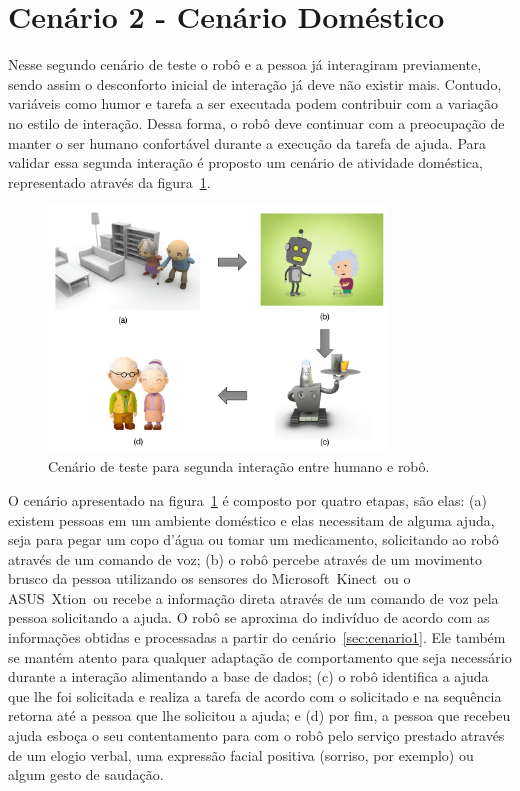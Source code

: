 \section{Cenário 2 - Cenário Doméstico}
\label{sec:cenario2}
Nesse segundo cenário de teste o robô e a pessoa já interagiram previamente, sendo assim o desconforto inicial de interação já deve não existir mais. Contudo, variáveis como humor e tarefa a ser executada podem contribuir com a variação no estilo de interação. Dessa forma, o robô deve continuar com a preocupação de manter o ser humano confortável durante a execução da tarefa de ajuda. Para validar essa segunda interação é proposto um cenário de atividade doméstica, representado através da figura~\ref{fig:cenario2}.

\begin{figure}[ht!]
	\centering
	\includegraphics[width=0.8\textwidth]{images/cenario02.png}
	\caption{Cenário de teste para segunda interação entre humano e robô.}
	\label{fig:cenario2}
\end{figure}

O cenário apresentado na figura~\ref{fig:cenario2} é composto por quatro etapas, são elas: (a) existem pessoas em um ambiente doméstico e elas necessitam de alguma ajuda, seja para pegar um copo d'água ou tomar um medicamento, solicitando ao robô através de um comando de voz; (b) o robô percebe através de um movimento brusco da pessoa utilizando os sensores do Microsoft\textregistered\ Kinect\textregistered\ ou o ASUS\textregistered\ Xtion\textregistered\ ou recebe a informação direta através de um comando de voz pela pessoa solicitando a ajuda. O robô se aproxima do indivíduo de acordo com as informações obtidas e processadas a partir do cenário~\ref{sec:cenario1}. Ele também se mantém atento para qualquer adaptação de comportamento que seja necessário durante a interação alimentando a base de dados; (c) o robô identifica a ajuda que lhe foi solicitada e realiza a tarefa de acordo com o solicitado e na sequência retorna até a pessoa que lhe solicitou a ajuda; e (d) por fim, a pessoa que recebeu ajuda esboça o seu contentamento para com o robô pelo serviço prestado através de um elogio verbal, uma expressão facial positiva (sorriso, por exemplo) ou algum gesto de saudação.

